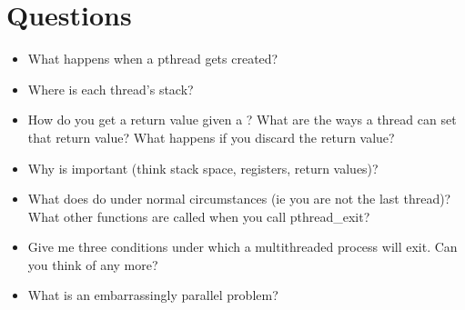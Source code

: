 \section{Questions}

\begin{itemize}
\tightlist
\item
What happens when a pthread gets created?
\item
Where is each thread's stack?
\item
How do you get a return value given a ? What are the ways a thread can set that return value? What happens if you discard the return value?
\item
Why is  important (think stack space, registers, return values)?
\item
What does  do under normal circumstances (ie you are not the last thread)? What other functions are called when you call pthread\_exit?
\item
Give me three conditions under which a multithreaded process will exit. Can you think of any more?
\item
What is an embarrassingly parallel problem?
\end{itemize}



